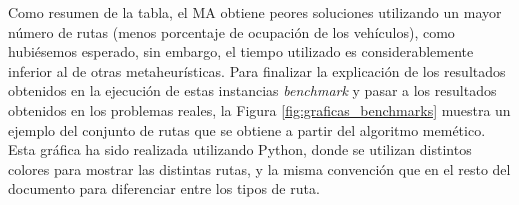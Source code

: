 Como resumen de la tabla, el MA obtiene peores soluciones utilizando un mayor número de rutas (menos porcentaje de ocupación de los vehículos), como hubiésemos esperado, sin embargo, el tiempo utilizado es considerablemente inferior al de otras metaheurísticas. Para finalizar la explicación de los resultados obtenidos en la ejecución de estas instancias \textit{benchmark} y pasar a los resultados obtenidos en los problemas reales, la Figura \ref{fig:graficas_benchmarks} muestra un ejemplo del conjunto de rutas que se obtiene a partir del algoritmo memético. Esta gráfica ha sido realizada utilizando Python, donde se utilizan distintos colores para mostrar las distintas rutas, y la misma convención que en el resto del documento para diferenciar entre los tipos de ruta.
\renewcommand{\arraystretch}{0.8}
